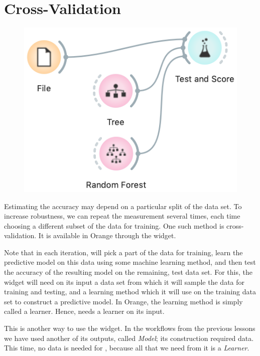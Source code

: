 \chapter{Cross-Validation}

\begin{figure}
    \vspace{-0.5cm}
    \includegraphics[scale=0.4]{graphics/ch-cross_validation/workflow.png}
\end{figure}

Estimating the accuracy may depend on a particular split of the data set. To increase robustness, we can repeat the measurement several times, each time choosing a different subset of the data for training. One such method is cross-validation. It is available in Orange through the  widget.

Note that in each iteration,  will pick a part of the data for training, learn the predictive model on this data using some machine learning method, and then test the accuracy of the resulting model on the remaining, test data set. For this, the widget will need on its input a data set from which it will sample the data for training and testing, and a learning method which it will use on the training data set to construct a predictive model. In Orange, the learning method is simply called a learner. Hence,  needs a learner on its input. 

This is another way to use the  widget. In the workflows from the previous lessons we have used another of its outputs, called \textit{Model}; its construction required data. This time, no data is needed for , because all that we need from it is a \textit{Learner}.

